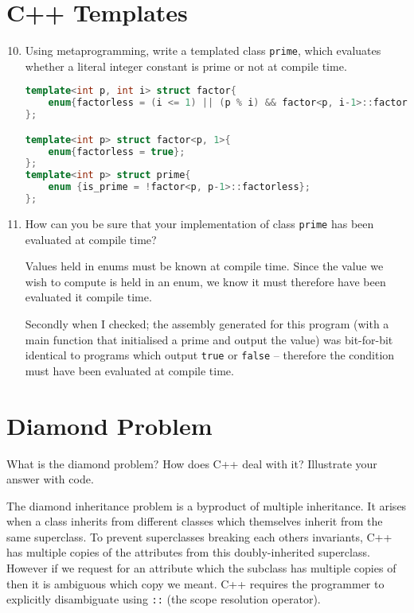 \documentclass[10pt,\jkfside,a4paper]{article}
\begin{document}
\section{C++ Templates}

\begin{enumerate}

\setcounter{enumi}{9}

\item Using metaprogramming, write a templated class \texttt{prime}, which
evaluates whether a literal integer constant is prime or not at compile time.

\begin{lstlisting}[language=C++]
template<int p, int i> struct factor{
    enum{factorless = (i <= 1) || (p % i) && factor<p, i-1>::factorless};
};

template<int p> struct factor<p, 1>{
    enum{factorless = true};
};
template<int p> struct prime{
    enum {is_prime = !factor<p, p-1>::factorless};
};
\end{lstlisting}

\item How can you be sure that your implementation of class \texttt{prime}
has been evaluated at compile time?

Values held in enums must be known at compile time. Since the value we wish
to compute is held in an enum, we know it must therefore have been evaluated
it compile time.

Secondly when I checked; the assembly generated for this program (with a main
function that initialised a prime and output the value) was
bit-for-bit identical to programs which output \texttt{true} or
\texttt{false} -- therefore the condition must have been evaluated at
compile time.

\end{enumerate}

\section{Diamond Problem}

What is the diamond problem? How does C++ deal with it? Illustrate
your answer with code.

The diamond inheritance problem is a byproduct of multiple inheritance. It
arises when a class inherits from different classes which themselves inherit
from the same superclass. To prevent superclasses breaking each others 
invariants, C++ has multiple copies of the attributes from this 
doubly-inherited superclass. However if we request for an attribute which 
the subclass has multiple copies of then it is ambiguous which copy we meant.
C++ requires the programmer to explicitly disambiguate using \texttt{::} (the
scope resolution operator).
\end{document}
